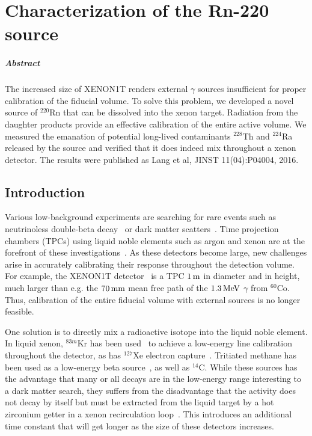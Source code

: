 
\chapter{Characterization of the Rn-220 source}\label{ch:rn220}

\paragraph{Abstract} The increased size of XENON1T renders external $\gamma$ sources insufficient for proper calibration of the fiducial volume. To solve this problem, we developed a novel source of $^{220}$Rn that can be dissolved into the xenon target. Radiation from the daughter products provide an effective calibration of the entire active volume. We measured the emanation of potential long-lived contaminants $^{228}$Th and $^{224}$Ra released by the source and verified that it does indeed mix throughout a xenon detector. The results were published as Lang et al, JINST 11(04):P04004, 2016.

\section{Introduction}

Various low-background experiments are searching for rare events such as neutrinoless double-beta decay~\cite{Pandola:2014naa} or dark matter scatters~\cite{Undagoitia:2015gya}. Time projection chambers (TPCs) using liquid noble elements such as argon and xenon are at the forefront of these investigations~\cite{Albert:2015eem,Aprile:2015uzo,Akerib:2015rjg,Amaudruz:2014nsa,Calvo:2015uln,Agnes:2015ftt}. As these detectors become large, new challenges arise in accurately calibrating their response throughout the detection volume. For example, the XENON1T detector~\cite{Aprile:2015uzo} is a TPC $1\,\mathrm{m}$ in diameter and in height, much larger than e.g. the $70\,\mathrm{mm}$ mean free path of the $1.3\,\mathrm{MeV}$ $\gamma$ from $^{60}$Co. Thus, calibration of the entire fiducial volume with external sources is no longer feasible.

One solution is to directly mix a radioactive isotope into the liquid noble element. In liquid xenon, $^{83m}$Kr has been used~\cite{Akerib:2017eql} to achieve a low-energy line calibration throughout the detector, as has $^{127}$Xe electron capture~\cite{Akerib:2017hph}. Tritiated methane has been used as a low-energy beta source~\cite{Akerib:2015wdi}, as well as $^{14}$C. While these sources has the advantage that many or all decays are in the low-energy range interesting to a dark matter search, they suffers from the disadvantage that the activity does not decay by itself but must be extracted from the liquid target by a hot zirconium getter in a xenon recirculation loop~\cite{Akerib:2015wdi}. This introduces an additional time constant that will get longer as the size of these detectors increases.

